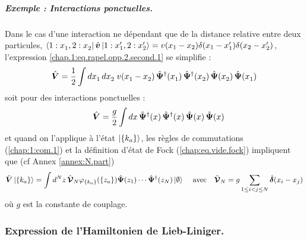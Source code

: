 \begin{mdframed}[
	linewidth=0.5pt, 
	backgroundcolor=gray!5, 
	roundcorner=50pt,	
	innerleftmargin=5pt,
    innerrightmargin=5pt,
    innertopmargin=-10pt,
    innerbottommargin=2pt,
    leftmargin=2pt,
    rightmargin=2pt
	]
\subparagraph{Exemple : Interactions ponctuelles.} 
Dans le cas d’une interaction ne dépendant que de la distance relative entre deux particules, $\bra{ 1 : x_1^{}, 2 : x_2^{} } \hat{\bm{v}} \ket{ 1 : x_1', 2 : x_2' } = v(x_1 -x_2)\delta(x_1 - x_1')\delta(x_2 - x_2') $,  l'expression \eqref{chap.1:eq.rapel.opp.2.second.1} se simplifie :
\begin{eqnarray}
     \hat{\bm{V}} =  
    \frac{1}{2} \int dx_1^{} \, dx_2^{} \; v(x_1^{} - x_2^{}) \,
    \hat{\bm{\Psi}}^\dagger(x_1^{}) \, \hat{\bm{\Psi}}^\dagger(x_2^{}) \, 
    \hat{\bm{\Psi}}(x_2^{}) \, \hat{\bm{\Psi}}(x_1^{})
    \label{eq:V_local}
\end{eqnarray} 
soit pour des interactions ponctuelles :	
\begin{eqnarray}\label{chap.1:eq.rapel.opp.2.second.ponctuel.1}
	\quad \hat{\bm{V}}  = \frac{g}{2} \int dx \,
    \hat{\bm{\Psi}}^\dagger(x) \, \hat{\bm{\Psi}}^\dagger(x) \, 
    \hat{\bm{\Psi}}(x) \, \hat{\bm{\Psi}}(x)  		
\end{eqnarray}
et quand on l'applique à l'état $\ket{\{k_a\}}$, les règles de commutations (\ref{chap:1:com.1}) et la définition d'état de Fock (\ref{chap:eq.vide.fock}) impliquent que (cf Annex \ref{annex:N.part})
\begin{eqnarray}\label{chap.1:eq.rapel.opp.2.second.ponctuel.2}
\hat{\bm{V}}\ket{\{k_a \}} =  \int d^Nz \, \hat{\bm{\mathcal{V}}}_N \varphi_{\{k_a\}}( \{z_a\} )\hat{\bm{\Psi}}(z_1)\cdots \hat{\bm{\Psi}}^\dag(z_N) \ket{\emptyset} \, \quad \mbox{avec} \quad  \hat{\bm{\mathcal{V}}}_N 	= g\sum_{1\leq i < j \leq N } \hat{\bm{\delta}}(x_i - x_j)	
\end{eqnarray}
où \( g \) est la constante de couplage.
\end{mdframed}




\subsubsection{Expression de l’Hamiltonien de Lieb-Liniger. }

